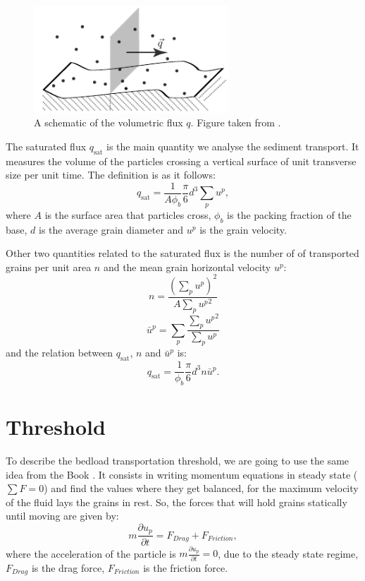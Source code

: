 \begin{figure}
    \centering
    \includegraphics[width=0.65\textwidth]{04-figuras/flux_density.pdf}
    \caption[Transport volumetric flux.]{A schematic of the volumetric flux $q$. Figure taken from \cite{Granular_Media_Between_Fluid_and_Solid}.}
    \label{fig:flux_density}
\end{figure}

    The saturated flux $q_\textrm{sat}$ is the main quantity we analyse the sediment transport. It measures the volume of the particles crossing a vertical surface of unit transverse size per unit time. The definition is as it follows:
\begin{equation}
    q_\textrm{sat} = \frac{1}{A \phi_b} \frac{\pi}{6}d^3 \sum_p u^p,
    \label{equ:qsat}
\end{equation}
where $A$ is the surface area that particles cross, $\phi_b$ is the packing fraction of the base, $d$ is the average grain diameter and $u^p$ is the grain velocity.

    Other two quantities related to the saturated flux is the number of of transported grains per unit area $n$ and the mean grain horizontal velocity $u^p$:
\begin{equation}
    n = \frac{\left(\sum_p u^p\right)^2}{A\sum_p {u^p}^2}
    \label{equ:n}
\end{equation}
\begin{equation}
    \bar{u}^p = \sum_p \frac{\sum_p {u^p}^2}{\sum_p {u^p}}
    \label{equ:up}
\end{equation}
and the relation between $q_\textrm{sat}$, $n$ and $\bar{u}^p$ is:
\begin{equation}
    q_\textrm{sat} = \frac{1}{\phi_b} \frac{\pi}{6} d^3 n \bar{u}^p.
\end{equation}

\section{Threshold}
    To describe the bedload transportation threshold, we are going to use the same idea from the Book \cite{Granular_Media_Between_Fluid_and_Solid}. It consists in writing momentum equations in steady state ($\sum F = 0$) and find the values where they get balanced, for the maximum velocity of the fluid lays the grains in rest. So, the forces that will hold grains statically until moving are given by:
\begin{equation}
    m\frac{\partial u_p}{\partial t} = F_{Drag} + F_{Friction},
\end{equation}
where the acceleration of the particle is $m\frac{\partial u_p}{\partial t} = 0$, due to the steady state regime, $F_{Drag}$ is the drag force, $F_{Friction}$ is the friction force.

